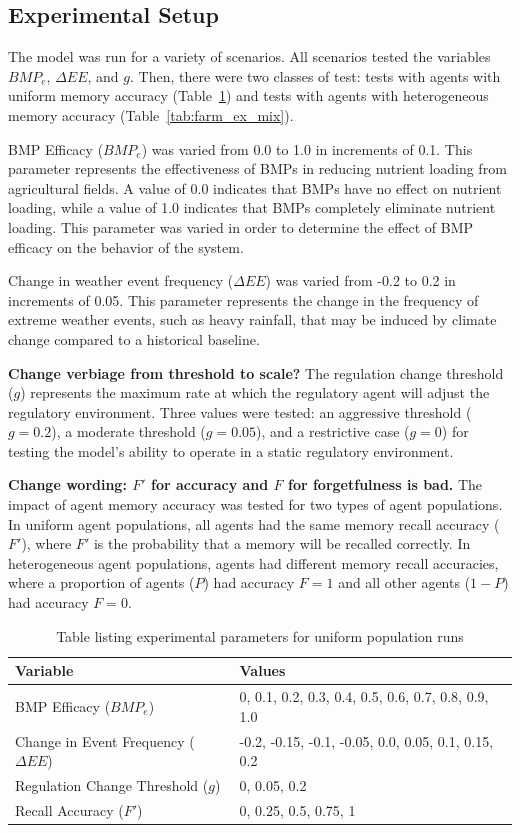 \subsection{Experimental Setup}
\label{subsec:farm_ex_setu}

The model was run for a variety of scenarios.
All scenarios tested the variables $BMP_e$, $\Delta EE$,
and $g$.
Then, there were two classes of test:
tests with agents with uniform memory accuracy (Table~\ref{tab:farm_ex_ar})
and tests with agents with heterogeneous memory accuracy
(Table~\ref{tab:farm_ex_mix}).

BMP Efficacy ($BMP_e$) was varied from 0.0 to 1.0 in increments of 0.1.
This parameter represents the effectiveness of BMPs in reducing nutrient
loading from agricultural fields.
A value of 0.0 indicates that BMPs have no effect on nutrient loading,
while a value of 1.0 indicates that BMPs completely eliminate nutrient loading.
This parameter was varied in order to determine the effect of BMP efficacy
on the behavior of the system.

Change in weather event frequency ($\Delta EE$) was varied from -0.2
to 0.2 in increments of 0.05.
This parameter represents the change in the frequency of extreme weather
events, such as heavy rainfall, that may be induced by climate change
compared to a historical baseline.

\textbf{Change verbiage from threshold to scale?}
The regulation change threshold ($g$) represents the maximum rate at which
the regulatory agent will adjust the regulatory environment.
Three values were tested: an aggressive threshold ($g=0.2$),
a moderate threshold ($g=0.05$), and
a restrictive case ($g=0$) for testing the model's ability to
operate in a static regulatory environment.

\textbf{Change wording: $F'$ for accuracy and $F$ for forgetfulness is bad.}
The impact of agent memory accuracy was tested for two types of agent
populations.
In uniform agent populations, all agents had the same memory recall
accuracy ($F'$), where $F'$ is the probability that a memory will be
recalled correctly.
In heterogeneous agent populations, agents had different memory recall
accuracies, 
where a proportion of agents ($P$) had accuracy $F=1$
and all other agents ($1-P$) had accuracy $F=0$.

\begin{table}
\centering
\caption{Table listing experimental parameters for uniform population runs}
\label{tab:farm_ex_ar}
\begin{tabular}{ll}
\hline
Variable & Values \\
\hline
BMP Efficacy ($BMP_e$) & 0, 0.1, 0.2, 0.3, 0.4, 0.5, 0.6, 0.7, 0.8, 0.9, 1.0 \\
Change in Event Frequency ($\Delta EE$)
    & -0.2, -0.15, -0.1, -0.05, 0.0, 0.05, 0.1, 0.15, 0.2 \\
Regulation Change Threshold ($g$)
    & 0, 0.05, 0.2 \\
Recall Accuracy ($F'$) & 0, 0.25, 0.5, 0.75, 1 \\
\hline
\end{tabular}
\end{table}

